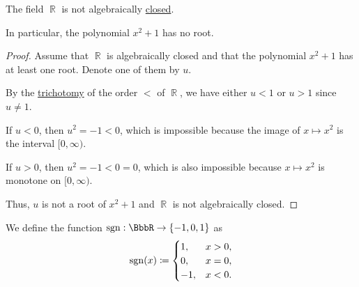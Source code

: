 \begin{proposition}\label{thm:reals_not_algebraically_closed}
  The field \( \BbbR \) is not algebraically \hyperref[def:algebraically_closed_field]{closed}.

  In particular, the polynomial \( x^2 + 1 \) has no root.
\end{proposition}
\begin{proof}
  Assume that \( \BbbR \) is algebraically closed and that the polynomial \( x^2 + 1 \) has at least one root. Denote one of them by \( u \).

  By the \hyperref[def:binary_relation/trichotomic]{trichotomy} of the order \( < \) of \( \BbbR \), we have either \( u < 1 \) or \( u > 1 \) since \( u \neq 1 \).

  If \( u < 0 \), then \( u^2 = -1 < 0 \), which is impossible because the image of \( x \mapsto x^2 \) is the interval \( [0, \infty) \).

  If \( u > 0 \), then \( u^2 = -1 < 0 = 0 \), which is also impossible because \( x \mapsto x^2 \) is monotone on \( [0, \infty) \).

  Thus, \( u \) is not a root of \( x^2 + 1 \) and \( \BbbR \) is not algebraically closed.
\end{proof}

\begin{definition}\label{def:signum}
  We define the  function \( \sgn: \BbbR \to \{ -1, 0, 1 \} \) as
  \begin{equation*}
    \operatorname{sgn}(x) \coloneqq \begin{cases}
      1,  & x > 0, \\
      0,  & x = 0, \\
      -1, & x < 0.
    \end{cases}
  \end{equation*}
\end{definition}
